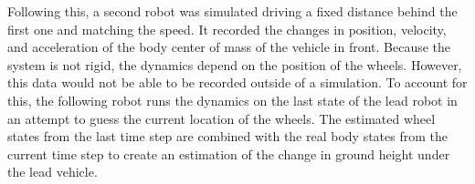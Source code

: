 Following this, a second robot was simulated driving a fixed distance behind the first one and matching the speed. It recorded the changes in position, velocity, and acceleration of the body center of mass of the vehicle in front. Because the system is not rigid, the dynamics depend on the position of the wheels. However, this data would not be able to be recorded outside of a simulation. To account for this, the following robot runs the dynamics on the last state of the lead robot in an attempt to guess the current location of the wheels. The estimated wheel states from the last time step are combined with the real body states from the current time step to create an estimation of the change in ground height under the lead vehicle.

